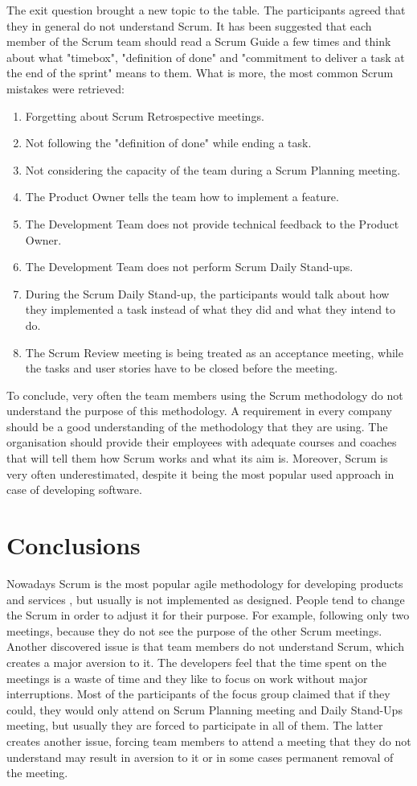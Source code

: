 The exit question brought a new topic to the table. The participants agreed that they in general do not understand Scrum. It has been suggested that each member of the Scrum team should read a Scrum Guide a few times and think about what "timebox", "definition of done" and "commitment to deliver a task at the end of the sprint" means to them. What is more, the most common Scrum mistakes were retrieved:
\begin{enumerate}
    \item Forgetting about Scrum Retrospective meetings.
    \item Not following the "definition of done" while ending a task.
    \item Not considering the capacity of the team during a Scrum Planning meeting.
    \item The Product Owner tells the team how to implement a feature.
    \item The Development Team does not provide technical feedback to the Product Owner.
    \item The Development Team does not perform Scrum Daily Stand-ups.
    \item During the Scrum Daily Stand-up, the participants would talk about how they implemented a task instead of what they did and what they intend to do.
    \item The Scrum Review meeting is being treated as an acceptance meeting, while the tasks and user stories have to be closed before the meeting.
\end{enumerate}

To conclude, very often the team members using the Scrum methodology do not understand the purpose of this methodology. A requirement in every company should be a good understanding of the methodology that they are using. The organisation should provide their employees with adequate courses and coaches that will tell them how Scrum works and what its aim is. Moreover, Scrum is very often underestimated, despite it being the most popular used approach in case of developing software.

\section{Conclusions}

Nowadays Scrum is the most popular agile methodology for developing products and services \cite{ArticleStateOfAgile}, but usually is not implemented as designed. People tend to change the Scrum in order to adjust it for their purpose. For example, following only two meetings, because they do not see the purpose of the other Scrum meetings. Another discovered issue is that team members do not understand Scrum, which creates a major aversion to it. The developers feel that the time spent on the meetings is a waste of time and they like to focus on work without major interruptions. Most of the participants of the focus group claimed that if they could, they would only attend on Scrum Planning meeting and Daily Stand-Ups meeting, but usually they are forced to participate in all of them. The latter creates another issue, forcing team members to attend a meeting that they do not understand may result in aversion to it or in some cases permanent removal of the meeting.

